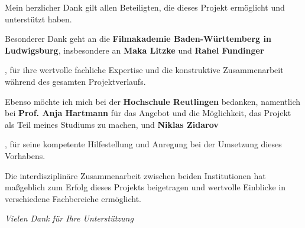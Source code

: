 
\vspace{4cm}

Mein herzlicher Dank gilt allen Beteiligten, die dieses Projekt ermöglicht und unterstützt haben.

\vspace{1em}

Besonderer Dank geht an die \textbf{Filmakademie Baden-Württemberg in Ludwigsburg}, insbesondere an \textbf{Maka Litzke} und \textbf{Rahel Fundinger}\raggedright , für ihre wertvolle fachliche Expertise und die konstruktive Zusammenarbeit während des gesamten Projektverlaufs.

\vspace{1em}

Ebenso möchte ich mich bei der \textbf{Hochschule Reutlingen} bedanken, namentlich bei \textbf{Prof. Anja Hartmann} für das Angebot und die Möglichkeit, das Projekt als Teil meines Studiums zu machen, und \textbf{Niklas Zidarov}\raggedright , für seine kompetente Hilfestellung und Anregung bei der Umsetzung dieses Vorhabens.

\vspace{1em}

Die interdisziplinäre Zusammenarbeit zwischen beiden Institutionen hat maßgeblich zum Erfolg dieses Projekts beigetragen und wertvolle Einblicke in verschiedene Fachbereiche ermöglicht.

\vspace{2cm}

\begin{flushright}
    \textit{Vielen Dank für Ihre Unterstützung}
\end{flushright}